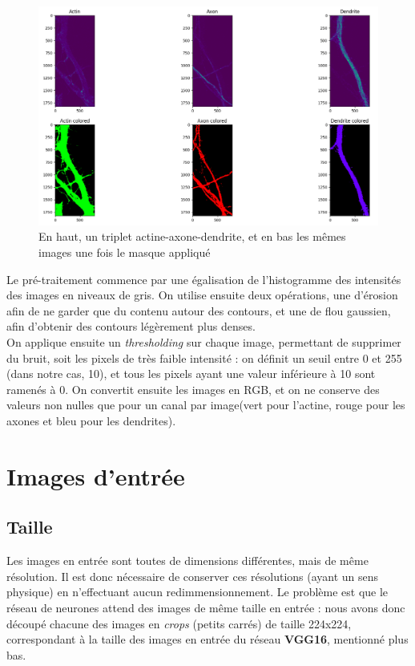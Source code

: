 \documentclass{report}
\begin{document}
\begin{figure}[H]
\centering
\includegraphics[scale=0.35]{"ex_mask"}
\caption{En haut, un triplet actine-axone-dendrite, et en bas les mêmes images une fois le masque appliqué}
\end{figure}

Le pré-traitement commence par une égalisation de l'histogramme des intensités
des images en niveaux de gris. On utilise ensuite deux opérations, une d'érosion
afin de ne garder que du contenu autour des contours, et une de flou gaussien,
afin d'obtenir des contours légèrement plus denses. \\
On applique ensuite un \textit{thresholding} sur chaque image,
permettant de supprimer du bruit, soit les pixels de très faible intensité :
on définit un seuil entre 0 et 255 (dans notre cas, 10), et tous les pixels ayant
une valeur inférieure à 10 sont ramenés à 0. On convertit ensuite les images en
RGB, et on ne conserve des valeurs non nulles que pour un canal par image(vert pour
l'actine, rouge pour les axones et bleu pour les dendrites).


\section{Images d'entrée}

\subsection{Taille}

Les images en entrée sont toutes de dimensions différentes, mais de même résolution.
Il est donc nécessaire de conserver ces résolutions (ayant un sens physique) en
n'effectuant aucun redimmensionnement. Le problème est que le réseau de neurones
attend des images de même taille en entrée : nous avons donc découpé chacune des
images en \textit{crops} (petits carrés) de taille 224x224, correspondant à la taille
des images en entrée du réseau \textbf{VGG16}, mentionné plus bas.
\end{document}
